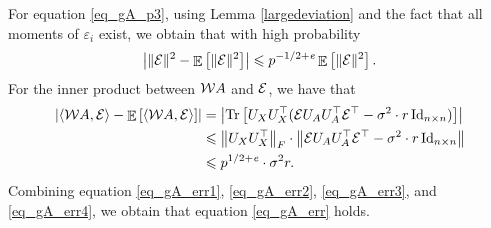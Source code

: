 	For equation \eqref{eq_gA_p3}, using Lemma \ref{largedeviation} and the fact that all moments of $\varepsilon_i$ exist, we obtain that with high probability
	\begin{align}
		\left\lvert\|\mathcal{E}\|^2 - \mathop{\mathbb{E}}\left[ \|\mathcal{E}\|^2 \right]\right\rvert \leqslant p^{-1/2 + {\mathit{e}}} \mathop{\mathbb{E}}\left[ \|\mathcal{E}\|^2 \right]. \label{eq_gA_err3}
	\end{align}
	For the inner product between ${\mathcal W} A$ and $\mathcal{E}$, we have that
	\begin{align}
		{\left| {\langle {\mathcal W}A, \mathcal{E}\rangle - \mathop{\mathbb{E}}\left[ \langle {\mathcal W}A, \mathcal{E}\rangle \right]} \right|} &= {\left| {\operatorname{Tr}\left[U_X U_X^{\top} (\mathcal{E} U_AU_A^{\top} \mathcal{E}^{\top} - \sigma^2 \cdot r \operatorname{Id}_{n\times n})\right]} \right|} \nonumber  \\
		&\leqslant \left\| U_{X} U_X^{\top} \right\|_{F} \cdot \left\| \mathcal{E} U_A U_A^{\top} \mathcal{E}^{\top} - \sigma^2 \cdot r \operatorname{Id}_{n\times n} \right\| \nonumber \\
		&\leqslant p^{1/2 + {\mathit{e}}} \cdot \sigma^2 r. \label{eq_gA_err4}
	\end{align}
	Combining equation \eqref{eq_gA_err1}, \eqref{eq_gA_err2}, \eqref{eq_gA_err3}, and \eqref{eq_gA_err4}, we obtain that  equation \eqref{eq_gA_err} holds.

